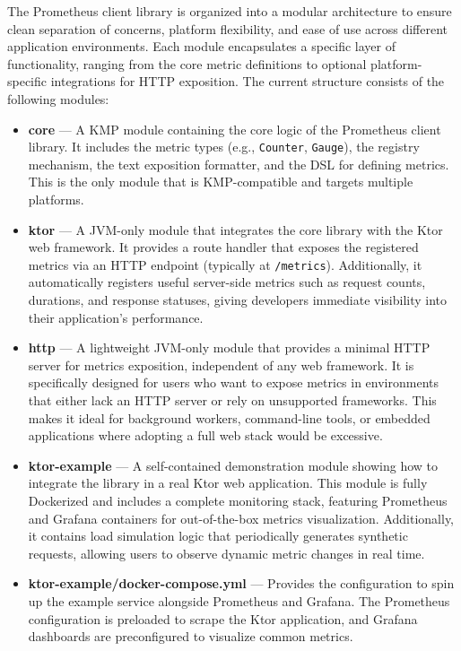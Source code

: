 The Prometheus client library is organized into a modular architecture to ensure clean separation of concerns, platform flexibility, and ease of use across different application environments.
Each module encapsulates a specific layer of functionality, ranging from the core metric definitions to optional platform-specific integrations for HTTP exposition.
The current structure consists of the following modules:


\begin{itemize}
    \item \textbf{core} --- A \ac{KMP} module containing the core logic of the Prometheus client library.
    It includes the metric types (e.g., \texttt{Counter}, \texttt{Gauge}), the registry mechanism, the text
    exposition formatter, and the \ac{DSL} for defining metrics.
    This is the only module that is \ac{KMP}-compatible and targets multiple platforms.

    \item \textbf{ktor} --- A \ac{JVM}-only module that integrates the core library with the Ktor web framework.
    It provides a route handler that exposes the registered metrics via an HTTP endpoint (typically at \texttt{/metrics}). Additionally, it automatically registers useful server-side metrics such as request counts, durations, and response statuses, giving developers immediate visibility into their application's performance.

    \item \textbf{http} --- A lightweight \ac{JVM}-only module that provides a minimal HTTP server for metrics
    exposition, independent of any web framework.
    It is specifically designed for users who want to expose metrics in environments that either lack an HTTP server or rely on unsupported frameworks.
    This makes it ideal for background workers, command-line tools, or embedded applications where adopting a full web stack would be excessive.

    \item \textbf{ktor-example} --- A self-contained demonstration module showing how to integrate the library in a real Ktor web application.
    This module is fully Dockerized and includes a complete monitoring stack, featuring Prometheus and Grafana containers for out-of-the-box metrics visualization.
    Additionally, it contains load simulation logic that periodically generates synthetic requests, allowing users to observe dynamic metric changes in real time.

    \item \textbf{ktor-example/docker-compose.yml} --- Provides the configuration to spin up the example service alongside Prometheus and Grafana.
    The Prometheus configuration is preloaded to scrape the Ktor application, and Grafana dashboards are preconfigured to visualize common metrics.
\end{itemize}

